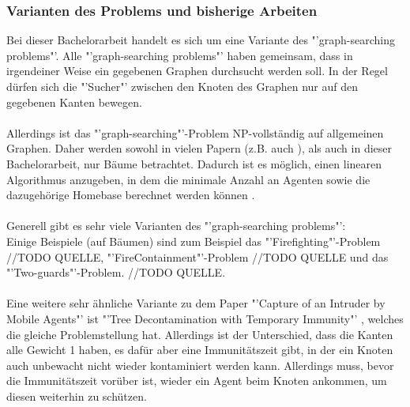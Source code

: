 \subsubsection*{Varianten des Problems und bisherige Arbeiten}

Bei dieser Bachelorarbeit handelt es sich um eine Variante des "'graph-searching problems"'. Alle "'graph-searching problems"' haben gemeinsam, dass in irgendeiner Weise ein gegebenen Graphen durchsucht werden soll. In der Regel dürfen sich die "'Sucher"' zwischen den Knoten des Graphen nur auf den gegebenen Kanten bewegen.
\\
\\
Allerdings ist das "'graph-searching"'-Problem NP-vollständig \cite{complexity_paper} auf allgemeinen Graphen. Daher werden sowohl in vielen Papern (z.B. auch \cite{cima_paper}), als auch in dieser Bachelorarbeit, nur Bäume betrachtet. Dadurch ist es möglich, einen linearen Algorithmus anzugeben, in dem die minimale Anzahl an Agenten sowie die dazugehörige Homebase berechnet werden können \cite{cima_paper}.
\\
\\
Generell gibt es sehr viele Varianten des "'graph-searching problems"':\\
Einige Beispiele (auf Bäumen) sind zum Beispiel das "'Firefighting"'-Problem //TODO QUELLE, "'FireContainment"'-Problem //TODO QUELLE und das "'Two-guards"'-Problem. //TODO QUELLE.
\\
\\
Eine weitere sehr ähnliche Variante zu dem Paper "'Capture of an Intruder by Mobile Agents"' \cite{cima_paper} ist "'Tree Decontamination with Temporary Immunity"' \cite{tdti_paper}, welches die gleiche Problemstellung hat. Allerdings ist der Unterschied, dass die Kanten alle Gewicht 1 haben, es dafür aber eine Immunitätszeit gibt, in der ein Knoten auch unbewacht nicht wieder kontaminiert werden kann. Allerdings muss, bevor die Immunitätszeit vorüber ist, wieder ein Agent beim Knoten ankommen, um diesen  weiterhin zu schützen.

